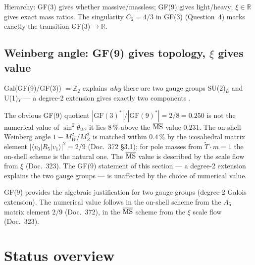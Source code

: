 \begin{keyresult}
Hierarchy: GF(3) gives whether massive/massless; GF(9) gives light/heavy;
$\xi\in\mathbb{R}$ gives exact mass ratios.
The singularity $C_2=4/3$ in GF(3) (Question~4) marks exactly the
transition GF(3)$\to\mathbb{R}$.
\end{keyresult}

\subsection{Weinberg angle: GF(9) gives topology, $\xi$ gives value}

Gal(GF(9)/GF(3)) $= \mathbb{Z}_2$ explains \emph{why} there are two gauge groups
SU(2)$_L$ and U(1)$_Y$ — a degree-2 extension gives exactly two
components \KM.

The obvious GF(9) quotient $|\mathrm{GF}(3)^*|/|\mathrm{GF}(9)^*| = 2/8 = 0.250$
is not the numerical value of $\sin^2\theta_W$; it lies 8\,\% above the
$\overline{\rm MS}$ value $0.231$. The on-shell Weinberg angle
$1-M_W^2/M_Z^2$ is matched within $0.4\,\%$ by the icosahedral matrix element
$|\langle v_0|R_5|v_1\rangle|^2 = 2/9$ (Doc.~372 §3.1); for pole masses from
$\tilde T\cdot m=1$ the on-shell scheme is the natural one. The
$\overline{\rm MS}$ value is described by the scale flow from $\xi$ (Doc.~323).
The GF(9) statement of this section --- a degree-2 extension explains the two
gauge groups --- is unaffected by the choice of numerical value.

\begin{keyresult}[Status~\KM]
GF(9) provides the algebraic justification for two gauge groups
(degree-2 Galois extension). The numerical value follows in the on-shell
scheme from the $A_5$ matrix element $2/9$ (Doc.~372), in the
$\overline{\rm MS}$ scheme from the $\xi$ scale flow (Doc.~323).
\end{keyresult}

\section{Status overview}

